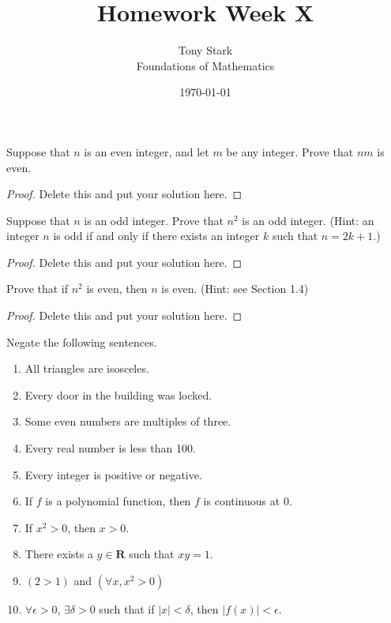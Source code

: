 \documentclass[12pt]{article}
\newenvironment{problem}[2][Problem]{\begin{trivlist}
\item[\hskip \labelsep {\bfseries #1}\hskip \labelsep {\bfseries #2.}]}{\end{trivlist}}
\begin{document}
 
 
\title{Homework Week X}%
\author{Tony Stark\\ %
Foundations of Mathematics} 
\date{\today} %
 
\maketitle

\begin{problem}{1}
Suppose that $n$ is an even integer, and let $m$ be any integer. Prove that $nm$ is even. 
\end{problem}
 
\begin{proof}
Delete this and put your solution here.
\end{proof}

\begin{problem}{2}
Suppose that $n$ is an odd integer. Prove that $n^2$ is an odd integer. (Hint: an integer $n$ is odd if and only if there exists an integer $k$ such that $n = 2k+1$.)
\end{problem}
 
\begin{proof}
Delete this and put your solution here.
\end{proof}
 
\begin{problem}{3}
Prove that if $n^2$ is even, then $n$ is even. (Hint: see Section 1.4)
\end{problem}
 
\begin{proof}
Delete this and put your solution here.
\end{proof} 
 
\begin{problem}{4}
Negate the following sentences.
\end{problem}

  \begin{enumerate}
\item All triangles are isosceles. 
\item Every door in the building was locked.
\item Some even numbers are multiples of three.
\item Every real number is less than 100.
\item Every integer is positive or negative.
\item If $f$ is a polynomial function, then $f$ is continuous at $0$.
\item If $x^2 > 0$, then $x > 0$.
\item There exists a $y \in \mathbf{R}$ such that $xy = 1$.
\item $(2 > 1)$ and $(\forall x, x^2 > 0)$
\item $\forall \epsilon > 0$, $\exists \delta > 0$ such that if $|x| < \delta$, then $|f(x)| < \epsilon$.
\end{enumerate}
\end{document}

